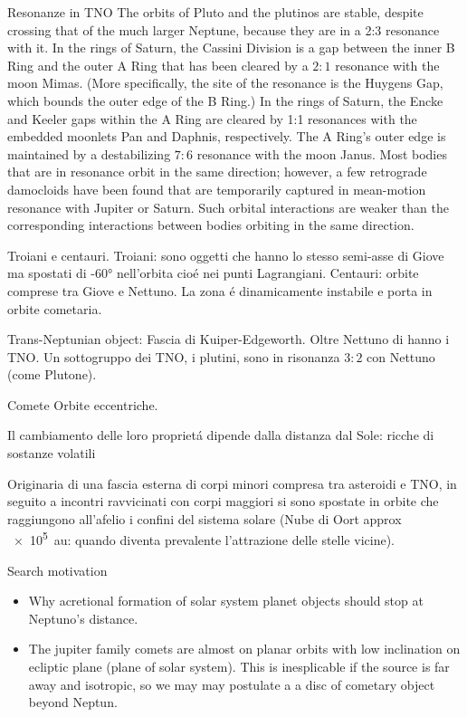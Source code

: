 \begin{frame}{Resonanze in TNO}
The orbits of Pluto and the plutinos are stable, despite crossing that of the much larger Neptune, because they are in a 2:3 resonance with it.
In the rings of Saturn, the Cassini Division is a gap between the inner B Ring and the outer A Ring that has been cleared by a $2:1$ resonance with the moon Mimas. (More specifically, the site of the resonance is the Huygens Gap, which bounds the outer edge of the B Ring.)
    In the rings of Saturn, the Encke and Keeler gaps within the A Ring are cleared by 1:1 resonances with the embedded moonlets Pan and Daphnis, respectively. The A Ring's outer edge is maintained by a destabilizing $7:6$ resonance with the moon Janus.
Most bodies that are in resonance orbit in the same direction; however, a few retrograde damocloids have been found that are temporarily captured in mean-motion resonance with Jupiter or Saturn. Such orbital interactions are weaker than the corresponding interactions between bodies orbiting in the same direction.
\end{frame}

\begin{frame}{Troiani e centauri.}
Troiani: sono oggetti che hanno lo stesso semi-asse di Giove ma spostati di \ang{+-60} nell'orbita cio\'e nei punti Lagrangiani.
Centauri: orbite comprese tra Giove e Nettuno. La zona \'e dinamicamente instabile e porta in orbite cometaria.
\end{frame}

\begin{frame}{Trans-Neptunian object: Fascia di Kuiper-Edgeworth.}
Oltre Nettuno di hanno i TNO.
Un sottogruppo dei TNO, i plutini, sono in risonanza $3:2$ con Nettuno (come Plutone).
\end{frame}

\begin{frame}{Comete}
Orbite eccentriche.

Il cambiamento delle loro propriet\'a dipende dalla distanza dal Sole: ricche di sostanze volatili

Originaria di una fascia esterna di corpi minori compresa tra asteroidi e TNO, in seguito a incontri ravvicinati con corpi maggiori si sono spostate in orbite che raggiungono all'afelio i confini del sistema solare (Nube di Oort approx \SI{e5}{\astronomicalunit}: quando diventa prevalente l'attrazione delle stelle vicine).
\end{frame}

\begin{frame}{Search motivation}
\begin{itemize}
\item Why acretional formation of solar system planet objects should stop at Neptuno's distance.
\item The jupiter family comets are almost on planar orbits with low inclination on ecliptic plane (plane of solar system). This is inesplicable if the source is far away and isotropic, so we may may postulate a a disc of cometary object beyond Neptun.
\end{itemize}
\end{frame}
